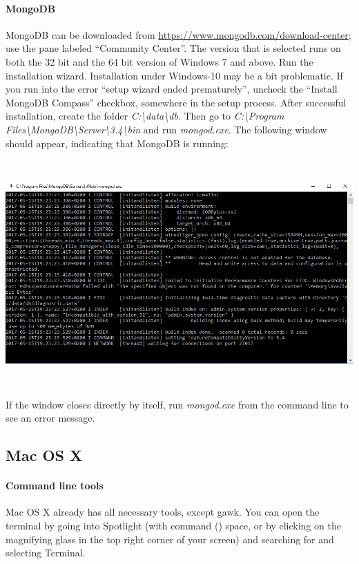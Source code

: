 \documentclass[a4paper]{report}
\begin{document}
\paragraph{MongoDB}
MongoDB can be downloaded from
\url{https://www.mongodb.com/download-center}; use the pane labeled
``Community Center''. The version that is
selected runs on both the 32 bit and the 64 bit version of Windows 7
and above. Run the installation wizard. Installation under Windows-10 may be
a bit problematic. If you run into the error ``setup wizard ended
prematurely'', uncheck the ``Install MongoDB Compass'' checkbox, somewhere in
the setup process. After successful installation, create the folder
\textit{C:{\textbackslash}data{\textbackslash}db}. Then go to
\textit{C:{\textbackslash}Program
Files{\textbackslash}MongoDB{\textbackslash}Server{\textbackslash}3.4{\textbackslash}bin}
and run \textit{mongod.exe}. The following window should appear,
indicating that MongoDB is running:

\noindent\begin{center}\includegraphics[width=6.4925in,height=3.3957in]{Syllabus-img5.png}
\end{center}

If the window closes directly by itself, run \textit{mongod.exe} from
the command line to see an error message.

\subsection*{Mac OS X}

\paragraph{Command line tools}
Mac OS X already has all necessary tools, except gawk. You can open the
terminal by going into Spotlight (with command (\cmdkey) space, or by
clicking on the magnifying glass in the top right corner of your
screen) and searching for and selecting Terminal. 
\end{document}
